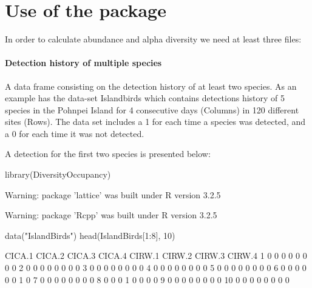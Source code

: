 \documentclass[article]{jss}
\begin{document}
\section{Use of the package}\label{use-of-the-package}

In order to calculate abundance and alpha diversity we need at least
three files:

\paragraph{Detection history of multiple
species}\label{detection-history-of-multiple-species}

A data frame consisting on the detection history of at least two
species. As an example  has the data-set
Islandbirds which contains detections history of 5 species in the
Pohnpei Island for 4 consecutive days (Columns) in 120 different sites
(Rows). The data set includes a 1 for each time a species was detected,
and a 0 for each time it was not detected.

A detection for the first two species is presented below:

\begin{CodeChunk}
\begin{CodeInput}
library(DiversityOccupancy)
\end{CodeInput}
\begin{CodeOutput}
Warning: package 'lattice' was built under R version 3.2.5
\end{CodeOutput}
\begin{CodeOutput}
Warning: package 'Rcpp' was built under R version 3.2.5
\end{CodeOutput}
\begin{CodeInput}
data("IslandBirds")
head(IslandBirds[1:8], 10)
\end{CodeInput}
\begin{CodeOutput}
   CICA.1 CICA.2 CICA.3 CICA.4 CIRW.1 CIRW.2 CIRW.3 CIRW.4
1       0      0      0      0      0      0      0      0
2       0      0      0      0      0      0      0      0
3       0      0      0      0      0      0      0      0
4       0      0      0      0      0      0      0      0
5       0      0      0      0      0      0      0      0
6       0      0      0      0      0      0      1      0
7       0      0      0      0      0      0      0      0
8       0      0      0      1      0      0      0      0
9       0      0      0      0      0      0      0      0
10      0      0      0      0      0      0      0      0
\end{CodeOutput}
\end{CodeChunk}
\end{document}
